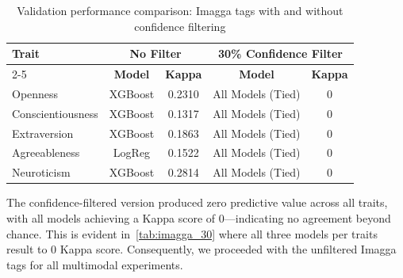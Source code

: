 \begin{table}[H]
	\centering
	\caption{Validation performance comparison: Imagga tags with and without confidence filtering}
	\label{tab:validation_imagga}
	\begin{tabular}{lcccc}
		\hline
		\multirow{2}{*}{\textbf{Trait}} & \multicolumn{2}{c}{\textbf{No Filter}} & \multicolumn{2}{c}{\textbf{30\% Confidence Filter}} \\
		\cline{2-5}
		& \textbf{Model} & \textbf{Kappa} & \textbf{Model} & \textbf{Kappa} \\
		\hline
		Openness          & XGBoost  & 0.2310 & All Models (Tied) & 0 \\
		Conscientiousness & XGBoost  & 0.1317 & All Models (Tied) & 0 \\
		Extraversion      & XGBoost  & 0.1863 & All Models (Tied) & 0 \\
		Agreeableness     & LogReg   & 0.1522 & All Models (Tied) & 0 \\
		Neuroticism       & XGBoost  & 0.2814 & All Models (Tied) & 0 \\
		\hline
	\end{tabular}
\end{table}

The confidence-filtered version produced zero predictive value across all traits, with all models achieving a Kappa score of 0---indicating no agreement beyond chance. This is evident in~\ref{tab:imagga_30} where all three models per traits result to 0 Kappa score. Consequently, we proceeded with the unfiltered Imagga tags for all multimodal experiments.

